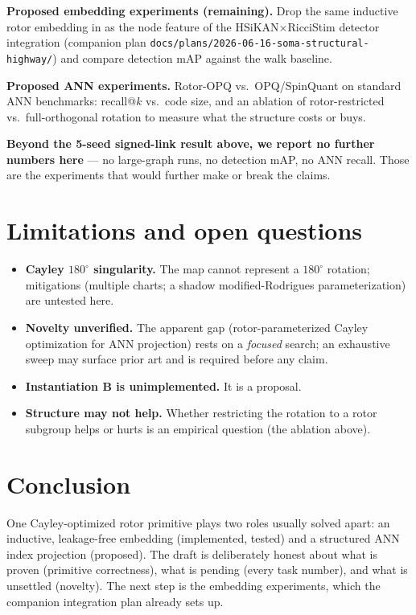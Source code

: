 \documentclass[11pt]{article}
\begin{document}
\textbf{Proposed embedding experiments (remaining).}
Drop the same inductive rotor embedding in as the node feature of the
HSiKAN$\times$RicciStim detector integration (companion plan
\texttt{docs/plans/2026-06-16-soma-structural-highway/}) and compare detection
mAP against the walk baseline.

\textbf{Proposed ANN experiments.} Rotor-OPQ vs.\ OPQ/SpinQuant on standard ANN
benchmarks: recall@$k$ vs.\ code size, and an ablation of rotor-restricted vs.\
full-orthogonal rotation to measure what the structure costs or buys.

\textbf{Beyond the 5-seed signed-link result above, we report no further numbers
here} --- no large-graph runs, no detection mAP, no ANN recall. Those are the
experiments that would further make or break the claims.

\section{Limitations and open questions}
\label{sec:limits}
\begin{itemize}[nosep]
  \item \textbf{Cayley $180^\circ$ singularity.} The map cannot represent a
        $180^\circ$ rotation; mitigations (multiple charts; a shadow
        modified-Rodrigues parameterization) are untested here.
  \item \textbf{Novelty unverified.} The apparent gap (rotor-parameterized Cayley
        optimization for ANN projection) rests on a \emph{focused} search; an
        exhaustive sweep may surface prior art and is required before any claim.
  \item \textbf{Instantiation B is unimplemented.} It is a proposal.
  \item \textbf{Structure may not help.} Whether restricting the rotation to a
        rotor subgroup helps or hurts is an empirical question (the ablation above).
\end{itemize}

\section{Conclusion}
One Cayley-optimized rotor primitive plays two roles usually solved apart: an
inductive, leakage-free embedding (implemented, tested) and a structured ANN index
projection (proposed). The draft is deliberately honest about what is proven
(primitive correctness), what is pending (every task number), and what is unsettled
(novelty). The next step is the embedding experiments, which the companion
integration plan already sets up.
\end{document}
